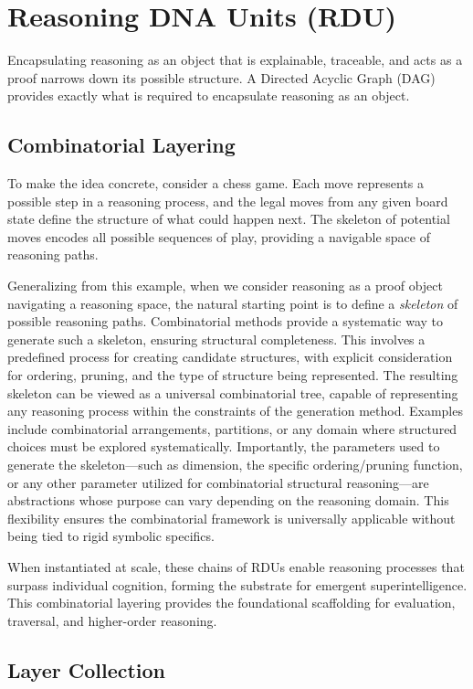 \documentclass[12pt]{article}
\begin{document}
\section{Reasoning DNA Units (RDU)}

Encapsulating reasoning as an object that is explainable, traceable, and acts as a proof narrows down its possible structure. A Directed Acyclic Graph (DAG) provides exactly what is required to encapsulate reasoning as an object. 

\subsection{Combinatorial Layering}
To make the idea concrete, consider a chess game. Each move represents a possible step in a reasoning process, and the legal moves from any given board state define the structure of what could happen next. The skeleton of potential moves encodes all possible sequences of play, providing a navigable space of reasoning paths.

Generalizing from this example, when we consider reasoning as a proof object navigating a reasoning space, the natural starting point is to define a \textit{skeleton} of possible reasoning paths. Combinatorial methods provide a systematic way to generate such a skeleton, ensuring structural completeness. This involves a predefined process for creating candidate structures, with explicit consideration for ordering, pruning, and the type of structure being represented. The resulting skeleton can be viewed as a universal combinatorial tree, capable of representing any reasoning process within the constraints of the generation method. Examples include combinatorial arrangements, partitions, or any domain where structured choices must be explored systematically. Importantly, the parameters used to generate the skeleton—such as dimension, the specific ordering/pruning function, or any other parameter utilized for combinatorial structural reasoning—are abstractions whose purpose can vary depending on the reasoning domain. This flexibility ensures the combinatorial framework is universally applicable without being tied to rigid symbolic specifics.

When instantiated at scale, these chains of RDUs enable reasoning processes that surpass individual cognition, forming the substrate for emergent superintelligence. This combinatorial layering provides the foundational scaffolding for evaluation, traversal, and higher-order reasoning.

\subsection{Layer Collection}
\end{document}
